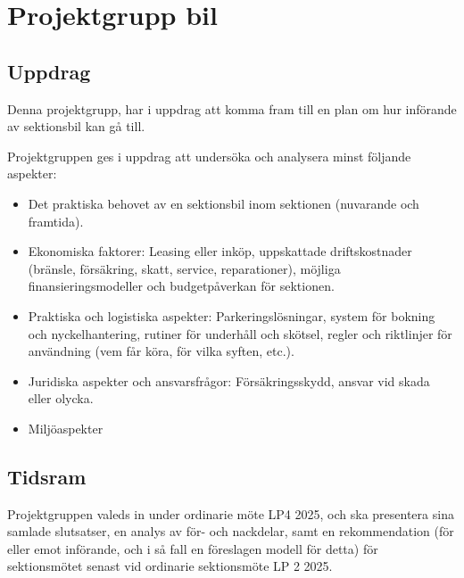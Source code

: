 \section{Projektgrupp bil}

\subsection{Uppdrag}
Denna projektgrupp, har i uppdrag att komma fram till en plan om hur införande av sektionsbil kan gå till.

Projektgruppen ges i uppdrag att undersöka och analysera minst följande aspekter:

\begin{itemize}
    \item Det praktiska behovet av en sektionsbil inom sektionen (nuvarande och framtida).
    \item Ekonomiska faktorer: Leasing eller inköp, uppskattade driftskostnader (bränsle, försäkring, skatt, service, reparationer), möjliga finansieringsmodeller och budgetpåverkan för sektionen.
    \item Praktiska och logistiska aspekter: Parkeringslösningar, system för bokning och nyckelhantering, rutiner för underhåll och skötsel, regler och riktlinjer för användning (vem får köra, för vilka syften, etc.).
    \item Juridiska aspekter och ansvarsfrågor: Försäkringsskydd, ansvar vid skada eller olycka.
    \item Miljöaspekter
\end{itemize}

\subsection{Tidsram}
Projektgruppen valeds in under ordinarie möte LP4 2025, och ska presentera sina samlade slutsatser, en analys av för- och nackdelar, samt en rekommendation (för eller emot införande, och i så fall en föreslagen modell för detta) för sektionsmötet senast vid ordinarie sektionsmöte LP 2 2025.
